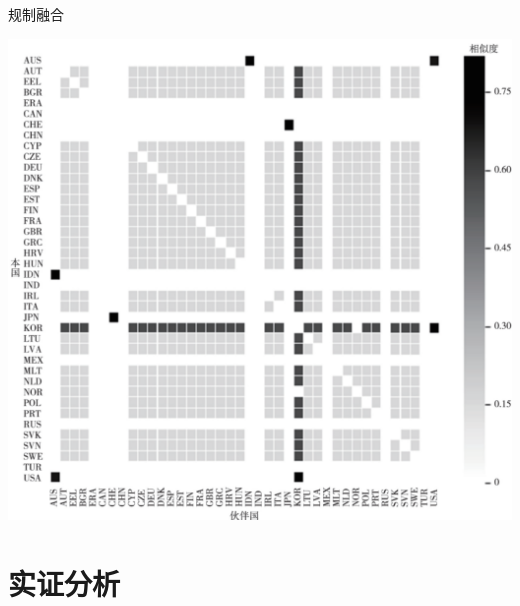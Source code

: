 \documentclass{beamer}
\begin{document}
\begin{frame}{规制融合}
    \begin{center}
        \includegraphics[height=0.8\textheight, keepaspectratio]{pic/Fig3.png}
    \end{center}
\end{frame}


\section{实证分析}
\end{document}
